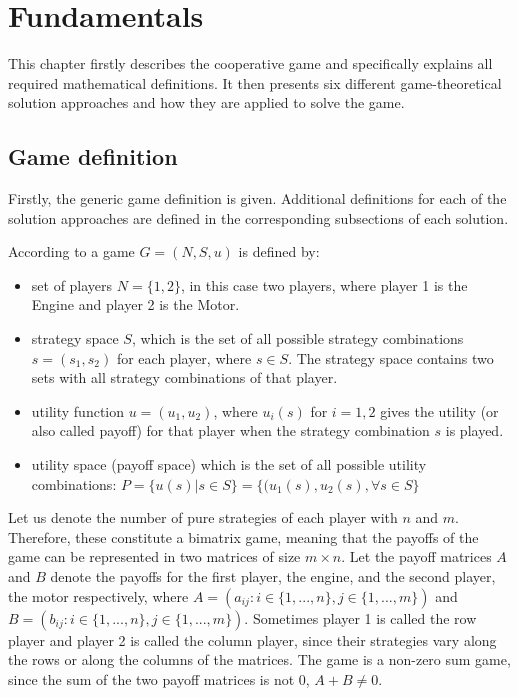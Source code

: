 \chapter{Fundamentals}
\label{chp:basics}
This chapter firstly describes the cooperative game and specifically explains all required mathematical definitions. It then presents six different game-theoretical solution approaches and how they are applied to solve the game.

\section{Game definition}
Firstly, the generic game definition is given. Additional definitions for each of the solution approaches are defined in the corresponding subsections of each solution.

According to \citet{holler2006einfuhrung} a game $G = (N,S,u)$ is defined by:
\begin{itemize}
\item
set of players $N = \{1,2\}$, in this case two players, where player 1 is the Engine and player 2 is the Motor.
\item
strategy space $S$, which is the set of all possible strategy combinations $s=(s_1,s_2)$ for each player, where $s\in S$. The strategy space contains two sets with all strategy combinations of that player.
\item
utility function $u = (u_1,u_2)$, where $u_i(s)$ for $i=1,2$ gives the utility (or also called payoff) for that player when the strategy combination $s$ is played.
\item
utility space (payoff space) which is the set of all possible utility combinations:
$P = \{u(s)|s \in S\} = \{(u_1(s),u_2(s),  \forall s \in S\}$
\end{itemize} 

Let us denote the number of pure strategies of each player with $n$ and $m$. Therefore, these constitute a bimatrix game, meaning that the payoffs of the game can be represented in two matrices of size $m \times n$. Let the payoff matrices $A$ and $B$ denote the payoffs for the first player, the engine, and the second player, the motor respectively, where $A = (a_{ij}: i \in \{1,...,n\}, j \in \{ 1,...,m\})$ and $B = (b_{ij}: i \in \{1,...,n\}, j \in \{ 1,...,m\})$. Sometimes player 1 is called the row player and player 2 is called the column player, since their strategies vary along the rows or along the columns of the matrices. The game is a non-zero sum game, since the sum of the two payoff matrices is not 0, $A + B \neq 0$.

